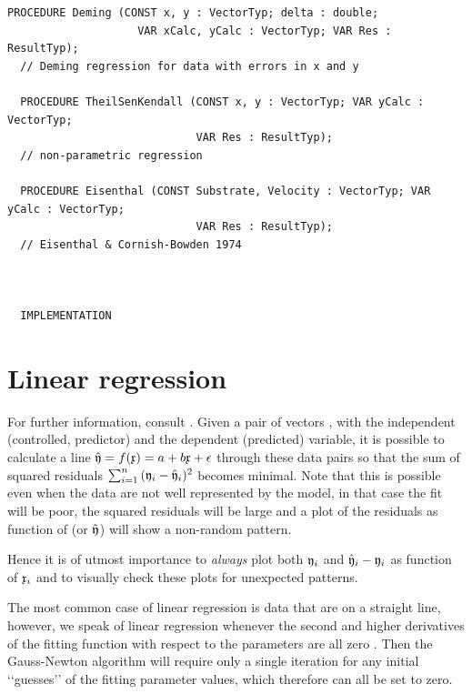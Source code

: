 \begin{refsection}
\begin{lstlisting}[caption=Interface]
  PROCEDURE Deming (CONST x, y : VectorTyp; delta : double;
                    VAR xCalc, yCalc : VectorTyp; VAR Res : ResultTyp);
  // Deming regression for data with errors in x and y

  PROCEDURE TheilSenKendall (CONST x, y : VectorTyp; VAR yCalc : VectorTyp;
                             VAR Res : ResultTyp);
  // non-parametric regression

  PROCEDURE Eisenthal (CONST Substrate, Velocity : VectorTyp; VAR yCalc : VectorTyp;
                             VAR Res : ResultTyp);
  // Eisenthal & Cornish-Bowden 1974



  IMPLEMENTATION
\end{lstlisting}



\section{Linear regression}

For further information, consult \parencite{Noa-80,Spa-82,Wil-61,Abr-64}. Given a pair of vectors , with  the independent (controlled, predictor) and  the dependent (predicted) variable, it is possible to calculate a line \(\hat{\mathfrak{y}} = f(\mathfrak{x}) = a + b \mathfrak{x} + \epsilon \) through these data pairs so that the sum of squared residuals \(\sum_{i=1}^{n}{(\mathfrak{y}_i - \hat{\mathfrak{y}}_i)^2} \) becomes minimal. Note that this is possible even when the data are not well represented by the model, in that case the fit will be poor, the squared residuals will be large and a plot of the residuals as function of  (or \(\hat{\mathfrak{y}} \)) will show a non-random pattern.

\begin{rules}
  Hence it is of utmost importance to \emph{always} plot both \(\mathfrak{y}_i \) and \(\hat{\mathfrak{y}}_i - \mathfrak{y}_i \) as function of \(\mathfrak{x}_i \) and to visually check these plots for unexpected patterns.
\end{rules}

The most common case of linear regression is data that are on a straight line, however, we speak of linear regression whenever the second and higher derivatives of the fitting function with respect to the parameters are all zero \parencite{Joh-10}.  Then the Gauss-Newton algorithm will require only a single iteration for any initial ‘‘guesses’’ of the fitting parameter values, which therefore can all be set to zero.


\end{refsection}
